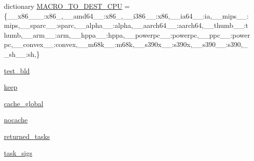 \begin{DoxyCompactItemize}
\item 
dictionary \hyperlink{namespacewaflib_1_1_tools_1_1c__config_ae089c683e7e1d3184631f75b4e913291}{M\+A\+C\+R\+O\+\_\+\+T\+O\+\_\+\+D\+E\+S\+T\+\_\+\+C\+PU} = \{\textquotesingle{}\+\_\+\+\_\+x86\+\_\+\_\+\+\_\+\textquotesingle{}\+:\textquotesingle{}x86\+\_\textquotesingle{},\textquotesingle{}\+\_\+\+\_\+amd64\+\_\+\+\_\+\textquotesingle{}\+:\textquotesingle{}x86\+\_\textquotesingle{},\textquotesingle{}\+\_\+\+\_\+i386\+\_\+\+\_\+\textquotesingle{}\+:\textquotesingle{}x86\textquotesingle{},\textquotesingle{}\+\_\+\+\_\+ia64\+\_\+\+\_\+\textquotesingle{}\+:\textquotesingle{}ia\textquotesingle{},\textquotesingle{}\+\_\+\+\_\+mips\+\_\+\+\_\+\textquotesingle{}\+:\textquotesingle{}mips\textquotesingle{},\textquotesingle{}\+\_\+\+\_\+sparc\+\_\+\+\_\+\textquotesingle{}\+:\textquotesingle{}sparc\textquotesingle{},\textquotesingle{}\+\_\+\+\_\+alpha\+\_\+\+\_\+\textquotesingle{}\+:\textquotesingle{}alpha\textquotesingle{},\textquotesingle{}\+\_\+\+\_\+aarch64\+\_\+\+\_\+\textquotesingle{}\+:\textquotesingle{}aarch64\textquotesingle{},\textquotesingle{}\+\_\+\+\_\+thumb\+\_\+\+\_\+\textquotesingle{}\+:\textquotesingle{}thumb\textquotesingle{},\textquotesingle{}\+\_\+\+\_\+arm\+\_\+\+\_\+\textquotesingle{}\+:\textquotesingle{}arm\textquotesingle{},\textquotesingle{}\+\_\+\+\_\+hppa\+\_\+\+\_\+\textquotesingle{}\+:\textquotesingle{}hppa\textquotesingle{},\textquotesingle{}\+\_\+\+\_\+powerpc\+\_\+\+\_\+\textquotesingle{}\+:\textquotesingle{}powerpc\textquotesingle{},\textquotesingle{}\+\_\+\+\_\+ppc\+\_\+\+\_\+\textquotesingle{}\+:\textquotesingle{}powerpc\textquotesingle{},\textquotesingle{}\+\_\+\+\_\+convex\+\_\+\+\_\+\textquotesingle{}\+:\textquotesingle{}convex\textquotesingle{},\textquotesingle{}\+\_\+\+\_\+m68k\+\_\+\+\_\+\textquotesingle{}\+:\textquotesingle{}m68k\textquotesingle{},\textquotesingle{}\+\_\+\+\_\+s390x\+\_\+\+\_\+\textquotesingle{}\+:\textquotesingle{}s390x\textquotesingle{},\textquotesingle{}\+\_\+\+\_\+s390\+\_\+\+\_\+\textquotesingle{}\+:\textquotesingle{}s390\textquotesingle{},\textquotesingle{}\+\_\+\+\_\+sh\+\_\+\+\_\+\textquotesingle{}\+:\textquotesingle{}sh\textquotesingle{},\}
\item 
\hyperlink{namespacewaflib_1_1_tools_1_1c__config_a131a49ac6fbbe7cd3fcb4cf3e32cb5b6}{test\+\_\+bld}
\item 
\hyperlink{namespacewaflib_1_1_tools_1_1c__config_a3c9db2503dbb0a83573d8cd530b49811}{keep}
\item 
\hyperlink{namespacewaflib_1_1_tools_1_1c__config_ad416bc18a4db5540d3c70a0d4edcab4b}{cache\+\_\+global}
\item 
\hyperlink{namespacewaflib_1_1_tools_1_1c__config_a73e9576f8883957dafdb1b992e3498b6}{nocache}
\item 
\hyperlink{namespacewaflib_1_1_tools_1_1c__config_a0b2cb53eb0c01eb09f71eb66d7249373}{returned\+\_\+tasks}
\item 
\hyperlink{namespacewaflib_1_1_tools_1_1c__config_a336b477587b3da272cadb8150ad8d41d}{task\+\_\+sigs}
\end{DoxyCompactItemize}


